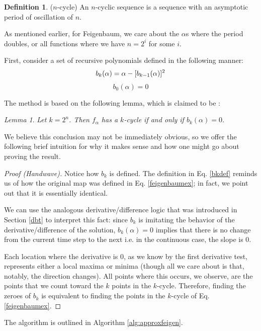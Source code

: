 \documentclass{article}
\theoremstyle{definition}
\newtheorem{definition}{Definition}[section]
\theoremstyle{remark}
\newtheorem{lemma}[theorem]{Lemma}
\begin{document}
\begin{definition}($n$-cycle)
    An $n$-cyclic sequence is a sequence with an asymptotic period of oscillation of $n$. 
\end{definition}
As mentioned earlier, for Feigenbaum, we care about the $\alpha$s where the period doubles, or all functions where we have $n = 2^i$ for some $i$.

First, consider a set of recursive polynomials defined in the following manner:
\begin{equation}\label{bkdef}
    b_k(\alpha) = \alpha - [b_{k-1}(\alpha)]^2 \\
\end{equation}
\begin{equation}
    b_0(\alpha) = 0
\end{equation}

The method is based on the following lemma, which is claimed to be :
\begin{lemma}
    \textit{Let $k = 2^n$. Then $f_\alpha$ has a $k$-cycle if and only if $b_k(\alpha) = 0$.}
\end{lemma}
We believe this conclusion may not be immediately obvious, so we offer the following brief intuition for why it makes sense and how one might go about proving the result. 
\begin{proof}[Proof (Handwave)]
     Notice how $b_k$ is defined. The definition in Eq. \ref{bkdef} reminds us of how the original map was defined in Eq. \ref{feigenbaumex}; in fact, we point out that it is essentially identical. 
     
     We can use the analogous derivative/difference logic that was introduced in Section \ref{dbt} to interpret this fact: since $b_k$ is imitating the behavior of the derivative/difference of the solution, $b_k(\alpha) = 0$ implies that there is no change from the current time step to the next i.e. in the continuous case, the slope is $0$.
     
     Each location where the derivative is $0$, as we know by the first derivative test, represents either a local maxima or minima (though all we care about is that, notably, the direction changes). All points where this occurs, we observe, are the points that we count toward the $k$ points in the $k$-cycle. Therefore, finding the zeroes of $b_k$ is equivalent to finding the points in the $k$-cycle of Eq. \ref{feigenbaumex}. 
\end{proof}

The algorithm is outlined in Algorithm \ref{alg:approxfeigen}.
\end{document}

